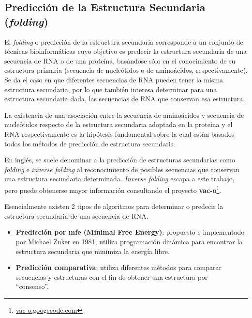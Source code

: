\subsection{Predicción de la Estructura Secundaria (\textbf{\emph{folding}})}

\par El \emph{folding} o predicción de la estructura secundaria corresponde a un conjunto de técnicas bioinformáticas cuyo objetivo es predecir la estructura secundaria de una secuencia de RNA o de una proteína, basándose sólo en el conocimiento de su estructura primaria (secuencia de nucleótidos o de aminoácidos, respectivamente). Se da el caso en que diferentes secuencias de RNA pueden tener la misma estructura secundaria, por lo que también interesa determinar para una estructura secundaria dada, las secuencias de RNA que conservan esa estructura.

\par La existencia de una asociación entre la secuencia de aminoácidos y secuencia de nucleótidos respecto de la estructura secundaria adoptada en la proteína y el RNA respectivamente es la hipótesis fundamental sobre la cual están basados todos los métodos de predicción de estructura secundaria. 
 
\par En inglés, se suele denominar a la predicción de estructuras secundarias como \emph{folding} e \emph{inverse folding} al reconocimiento de posibles secuencias que conservan una estructura secundaria determinada. \emph{Inverse folding} escapa a este trabajo, pero puede obtenerse mayor información consultando el proyecto \textbf{vac-o}\footnote{\url{vac-o.googecode.com}}.

\par Esencialmente existen 2 tipos de algoritmos para determinar o predecir la estructura secundaria de una secuencia de RNA.
\begin{itemize} 
	\item \textbf{Predicción por mfe (Minimal Free Energy)}: propuesto e implementado por Michael Zuker en 1981\cite{Zuker81}, utiliza programación dinámica para encontrar la estructura secundaria que minimiza la energía libre.

	\item \textbf{Predicción comparativa}: utiliza diferentes métodos para comparar secuencias y estructuras con el fin de obtener una estructura por \\
	 ``consenso''\cite{Gardner04}.
\end{itemize}

